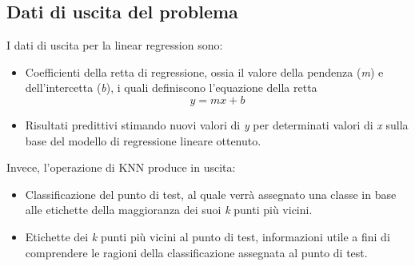 \documentclass[11pt]{article}
\theoremstyle{definition}
\begin{document}
\subsection{Dati di uscita del problema}
I dati di uscita per la linear regression sono:
\begin{itemize}
\item Coefficienti della retta di regressione, ossia il valore della pendenza (\textit{m}) e dell'intercetta (\textit{b}), i quali definiscono l'equazione della retta
$$
y = mx + b
$$
\item Risultati predittivi stimando nuovi valori di \textit{y} per determinati valori di \textit{x} sulla base del modello di regressione lineare ottenuto.
\end{itemize}
Invece, l'operazione di KNN produce in uscita:
\begin{itemize}
\item Classificazione del punto di test, al quale verrà assegnato una classe in base alle etichette della maggioranza dei suoi \textit{k} punti più vicini.
\item Etichette dei \textit{k} punti più vicini al punto di test, informazioni utile a fini di comprendere le ragioni della classificazione assegnata al punto di test.
\end{itemize}
\end{document}
